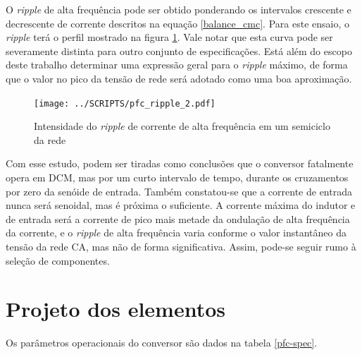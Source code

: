 \documentclass[
        12pt,
        openany, %
        oneside, %
        a4paper,			
        english,			
        brazil
        ]{abntbibufjf}
\begin{document}
O \textit{ripple} de alta frequência pode ser obtido ponderando os intervalos crescente e decrescente de corrente descritos na equação \ref{balance_cmc}. Para este ensaio, o \textit{ripple} terá o perfil mostrado na figura \ref{pfc_ripple}. Vale notar que esta curva pode ser severamente distinta para outro conjunto de especificações. Está além do escopo deste trabalho determinar uma expressão geral para o \textit{ripple} máximo, de forma que o valor no pico da tensão de rede será adotado como uma boa aproximação.

\begin{figure}[!h]
	\centering
	\caption{Intensidade do \textit{ripple} de corrente de alta frequência em um semiciclo da rede}
	\texttt{[image: ../SCRIPTS/pfc\_ripple\_2.pdf]}\\
	\label{pfc_ripple}
\end{figure}


Com esse estudo, podem ser tiradas como conclusões que o conversor fatalmente opera em DCM, mas por um curto intervalo de tempo, durante os cruzamentos por zero da senóide de entrada. Também constatou-se que a corrente de entrada nunca será senoidal, mas é próxima o suficiente. A corrente máxima do indutor e de entrada será a corrente de pico mais metade da ondulação de alta frequência da corrente, e o \textit{ripple} de alta frequência varia conforme o valor instantâneo da tensão da rede CA, mas não de forma significativa. Assim, pode-se seguir rumo à seleção de componentes.


\section{Projeto  dos elementos}


Os parâmetros operacionais do conversor são dados na tabela \ref{pfc-spec}.
\end{document}
